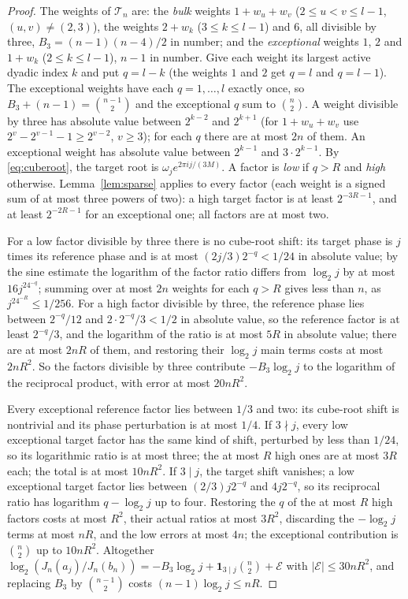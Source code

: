 \begin{proof}
The weights of $\mathcal T_n$ are: the \emph{bulk} weights $1+w_u+w_v$
($2\le u<v\le l-1$, $(u,v)\ne(2,3)$), the weights $2+w_k$ ($3\le k\le l-1$) and
$6$, all divisible by three, $B_3=(n-1)(n-4)/2$ in number; and the
\emph{exceptional} weights $1$, $2$ and $1+w_k$ ($2\le k\le l-1$), $n-1$ in
number. Give each weight its largest active dyadic index $k$ and put $q=l-k$
(the weights $1$ and $2$ get $q=l$ and $q=l-1$). The exceptional weights have
each $q=1,\dots,l$ exactly once, so $B_3+(n-1)=\binom{n-1}2$ and the exceptional
$q$ sum to $\binom n2$. A weight divisible by three has absolute value between
$2^{k-2}$ and $2^{k+1}$ (for $1+w_u+w_v$ use $2^v-2^{v-1}-1\ge2^{v-2}$, $v\ge3$);
for each $q$ there are at most $2n$ of them. An exceptional weight has absolute
value between $2^{k-1}$ and $3\cdot2^{k-1}$. By \eqref{eq:cuberoot}, the target
root is $\omega_je^{2\pi ij/(3M)}$. A factor is \emph{low} if $q>R$ and
\emph{high} otherwise. Lemma~\ref{lem:sparse} applies to every factor (each
weight is a signed sum of at most three powers of two): a high target factor is
at least $2^{-3R-1}$, and at least $2^{-2R-1}$ for an exceptional one; all
factors are at most two.

For a low factor divisible by three there is no cube-root shift: its target
phase is $j$ times its reference phase and is at most $(2j/3)2^{-q}<1/24$ in
absolute value; by the sine estimate the logarithm of the factor ratio differs
from $\log_2j$ by at most $16j^24^{-q}$; summing over at most $2n$ weights for
each $q>R$ gives less than $n$, as $j^24^{-R}\le1/256$. For a high factor
divisible by three, the reference phase lies between $2^{-q}/12$ and
$2\cdot2^{-q}/3<1/2$ in absolute value, so the reference factor is at least
$2^{-q}/3$, and the logarithm of the ratio is at most $5R$ in absolute value;
there are at most $2nR$ of them, and restoring their $\log_2j$ main terms costs
at most $2nR^2$. So the factors divisible by three contribute $-B_3\log_2j$ to the
logarithm of the reciprocal product, with error at most $20nR^2$.

Every exceptional reference factor lies between $1/3$ and two: its cube-root
shift is nontrivial and its phase perturbation is at most $1/4$. If $3\nmid j$,
every low exceptional target factor has the same kind of shift, perturbed by
less than $1/24$, so its logarithmic ratio is at most three; the at most $R$
high ones are at most $3R$ each; the total is at most $10nR^2$. If $3\mid j$,
the target shift vanishes; a low exceptional target factor lies between
$(2/3)j2^{-q}$ and $4j2^{-q}$, so its reciprocal ratio has logarithm $q-\log_2j$
up to four. Restoring the $q$ of the at most $R$ high factors costs at most
$R^2$, their actual ratios at most $3R^2$, discarding the $-\log_2j$ terms at
most $nR$, and the low errors at most $4n$; the exceptional contribution is
$\binom n2$ up to $10nR^2$. Altogether
$\log_2(J_n(a_j)/J_n(b_n))=-B_3\log_2j+\mathbf1_{3\mid j}\binom n2+\mathcal E$ with
$|\mathcal E|\le30nR^2$, and replacing $B_3$ by $\binom{n-1}2$ costs
$(n-1)\log_2j\le nR$.


\end{proof}
